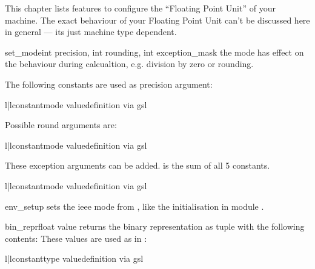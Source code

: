 
This chapter lists features to configure the ``Floating Point Unit'' of your machine.
The exact behaviour of your Floating Point Unit can't be discussed here in general --- its just machine type dependent.

\begin{funcdesc} {set_mode}{int precision, int rounding, int exception\_mask}
the mode has effect on the behaviour during calcualtion, e.g. division by zero or rounding.

The following constants are used as precision argument:
\begin{tableii}{l|l}{constant}{mode value}{definition via gsl}
\end{tableii}
Possible round arguments are:
\begin{tableii}{l|l}{constant}{mode value}{definition via gsl}
\end{tableii}
These exception arguments can be added.
 is the sum of all 5  constants.
\begin{tableii}{l|l}{constant}{mode value}{definition via gsl}
\end{tableii}
\end{funcdesc}

\begin{funcdesc} {env\_setup}{}
sets the ieee mode from , like the initialisation in module .
\end{funcdesc}

\begin{funcdesc} {bin\_repr}{float value}
returns the binary representation as tuple with the following contents:
These values are used as  in :
\begin{tableii}{l|l}{constant}{type value}{definition via gsl}
\end{tableii}
\end{funcdesc}

